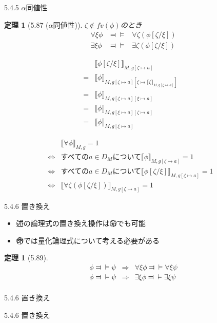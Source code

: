\documentclass[dvipdfmx,11pt]{beamer}
\newcommand{\predl}{\textcircled{\scriptsize 述}}
\newcommand{\propl}{\textcircled{\scriptsize 命}}
\newtheorem{theo}[theorem]{定理}
\begin{document}
\begin{frame}{5.4.5 \(\alpha\)同値性}
  \begin{theo}[5.87 (\(\alpha\)同値性)]
    \(\zeta\not\in\textit{fv}(\phi)\)のとき
    \begin{eqnarray*}
      \forall \xi \phi & \Dashv\vDash & \forall \zeta ( \phi [ \zeta / \xi ] ) \\
      \exists \xi \phi & \Dashv\vDash & \exists \zeta ( \phi [ \zeta / \xi ] )
    \end{eqnarray*}
  \end{theo}

  \[
  \begin{array}{rll}
    & \llbracket \phi [ \zeta / \xi ] \rrbracket_{M,g[\zeta\mapsto a]} & \\
    = & \llbracket \phi \rrbracket_{M,g[\zeta\mapsto a][\xi\mapsto\llbracket\zeta\rrbracket_{M,g[\zeta\mapsto a]}]} & \\
    = & \llbracket \phi \rrbracket_{M,g[\zeta\mapsto a][\xi\mapsto a]} & \\
    = & \llbracket \phi \rrbracket_{M,g[\xi\mapsto a][\zeta\mapsto a]} & \\
    = & \llbracket \phi \rrbracket_{M,g[\xi\mapsto a]} & 
  \end{array}
  \]

  \[
  \begin{array}{rll}
    & \llbracket \forall \phi \rrbracket_{M,g} = 1 & \\
    \iff & \textit{すべての}a\in D_M\textit{について}\llbracket\phi\rrbracket_{M,g[\zeta\mapsto a]} = 1 & \\
    \iff & \textit{すべての}a\in D_M\textit{について}\llbracket\phi[\zeta/\xi]\rrbracket_{M,g[\zeta\mapsto a]} = 1 & \\
    \iff & \llbracket\forall\zeta(\phi[\zeta/\xi])\rrbracket_{M,g[\zeta\mapsto a]} = 1 &

  \end{array}
  \]

\end{frame}

\begin{frame}{5.4.6 置き換え}
  \begin{itemize}
  \item \predl{}の論理式の置き換え操作は\propl{}でも可能
  \item \propl{}では量化論理式について考える必要がある
  \end{itemize}

  \begin{theo}[5.89]
    \begin{eqnarray*}
      \phi \Dashv \vDash \psi & \Rightarrow & \forall \xi \phi \Dashv \vDash \forall \xi \psi \\
      \phi \Dashv \vDash \psi & \Rightarrow & \exists \xi \phi \Dashv \vDash \exists \xi \psi \\
    \end{eqnarray*}
  \end{theo}

\end{frame}

\begin{frame}{5.4.6 置き換え}
\end{frame}

\begin{frame}{5.4.6 置き換え}
\end{frame}
\end{document}
